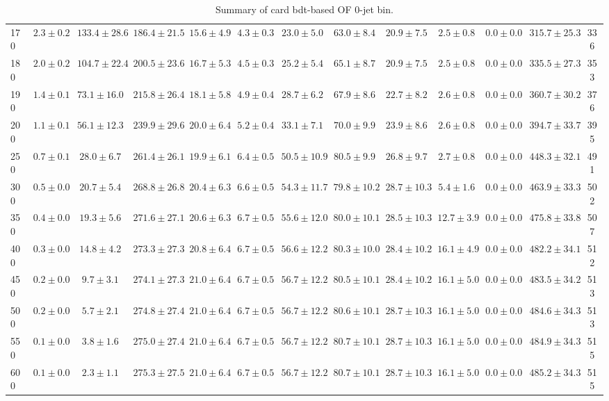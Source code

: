 \begin{table}
{\begin{center}
\begin{tabular}{l | c c | c c c c c c c c  | c c}
170 & $2.3\pm0.2$ & $133.4\pm28.6$ & $186.4\pm21.5$ & $15.6\pm4.9$ & $4.3\pm0.3$ & $23.0\pm5.0$ & $63.0\pm8.4$ & $20.9\pm7.5$ & $2.5\pm0.8$ & $0.0\pm0.0$ & $315.7\pm25.3$ & 336 \\
180 & $2.0\pm0.2$ & $104.7\pm22.4$ & $200.5\pm23.6$ & $16.7\pm5.3$ & $4.5\pm0.3$ & $25.2\pm5.4$ & $65.1\pm8.7$ & $20.9\pm7.5$ & $2.5\pm0.8$ & $0.0\pm0.0$ & $335.5\pm27.3$ & 353 \\
190 & $1.4\pm0.1$ & $73.1\pm16.0$ & $215.8\pm26.4$ & $18.1\pm5.8$ & $4.9\pm0.4$ & $28.7\pm6.2$ & $67.9\pm8.6$ & $22.7\pm8.2$ & $2.6\pm0.8$ & $0.0\pm0.0$ & $360.7\pm30.2$ & 376 \\
200 & $1.1\pm0.1$ & $56.1\pm12.3$ & $239.9\pm29.6$ & $20.0\pm6.4$ & $5.2\pm0.4$ & $33.1\pm7.1$ & $70.0\pm9.9$ & $23.9\pm8.6$ & $2.6\pm0.8$ & $0.0\pm0.0$ & $394.7\pm33.7$ & 395 \\
250 & $0.7\pm0.1$ & $28.0\pm6.7$ & $261.4\pm26.1$ & $19.9\pm6.1$ & $6.4\pm0.5$ & $50.5\pm10.9$ & $80.5\pm9.9$ & $26.8\pm9.7$ & $2.7\pm0.8$ & $0.0\pm0.0$ & $448.3\pm32.1$ & 491 \\
300 & $0.5\pm0.0$ & $20.7\pm5.4$ & $268.8\pm26.8$ & $20.4\pm6.3$ & $6.6\pm0.5$ & $54.3\pm11.7$ & $79.8\pm10.2$ & $28.7\pm10.3$ & $5.4\pm1.6$ & $0.0\pm0.0$ & $463.9\pm33.3$ & 502 \\
350 & $0.4\pm0.0$ & $19.3\pm5.6$ & $271.6\pm27.1$ & $20.6\pm6.3$ & $6.7\pm0.5$ & $55.6\pm12.0$ & $80.0\pm10.1$ & $28.5\pm10.3$ & $12.7\pm3.9$ & $0.0\pm0.0$ & $475.8\pm33.8$ & 507 \\
400 & $0.3\pm0.0$ & $14.8\pm4.2$ & $273.3\pm27.3$ & $20.8\pm6.4$ & $6.7\pm0.5$ & $56.6\pm12.2$ & $80.3\pm10.0$ & $28.4\pm10.2$ & $16.1\pm4.9$ & $0.0\pm0.0$ & $482.2\pm34.1$ & 512 \\
450 & $0.2\pm0.0$ & $9.7\pm3.1$ & $274.1\pm27.3$ & $21.0\pm6.4$ & $6.7\pm0.5$ & $56.7\pm12.2$ & $80.5\pm10.1$ & $28.4\pm10.2$ & $16.1\pm5.0$ & $0.0\pm0.0$ & $483.5\pm34.2$ & 513 \\
500 & $0.2\pm0.0$ & $5.7\pm2.1$ & $274.8\pm27.4$ & $21.0\pm6.4$ & $6.7\pm0.5$ & $56.7\pm12.2$ & $80.6\pm10.1$ & $28.7\pm10.3$ & $16.1\pm5.0$ & $0.0\pm0.0$ & $484.6\pm34.3$ & 513 \\
550 & $0.1\pm0.0$ & $3.8\pm1.6$ & $275.0\pm27.4$ & $21.0\pm6.4$ & $6.7\pm0.5$ & $56.7\pm12.2$ & $80.7\pm10.1$ & $28.7\pm10.3$ & $16.1\pm5.0$ & $0.0\pm0.0$ & $484.9\pm34.3$ & 515 \\
600 & $0.1\pm0.0$ & $2.3\pm1.1$ & $275.3\pm27.5$ & $21.0\pm6.4$ & $6.7\pm0.5$ & $56.7\pm12.2$ & $80.7\pm10.1$ & $28.7\pm10.3$ & $16.1\pm5.0$ & $0.0\pm0.0$ & $485.2\pm34.3$ & 515 \\
\hline
\end{tabular}
\end{center}
}
\caption{Summary of card bdt-based OF 0-jet bin.}
\end{table}
